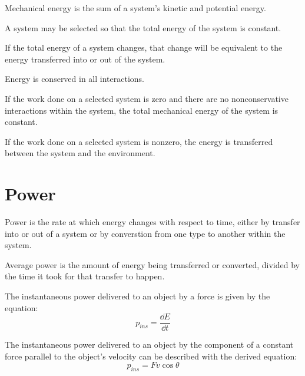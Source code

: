 \documentclass[../mech.tex]{subfiles}
\begin{document}
Mechanical energy is the sum of a system's kinetic and potential energy.

A system may be selected so that the total energy of the system is constant.

If the total energy of a system changes, that change will be equivalent to the energy transferred into or out of the system.

Energy is conserved in all interactions.

If the work done on a selected system is zero and there are no nonconservative interactions within the system, the total mechanical energy of the system is constant.

If the work done on a selected system is nonzero, the energy is transferred between the system and the environment.

\section{Power}
Power is the rate at which energy changes with respect to time, either by transfer into or out of a system or by converstion from one type to another within the system.

Average power is the amount of energy being transferred or converted, divided by the time it took for that transfer to happen.

The instantaneous power delivered to an object by a force is given by the equation:
\[ p_{ins}=\frac{\dd E}{\dd t} \]

The instantaneous power delivered to an object by the component of a constant force parallel to the object's velocity can be described with the derived equation:
\[ p_{ins}=Fv\cos\theta \]
\end{document}
